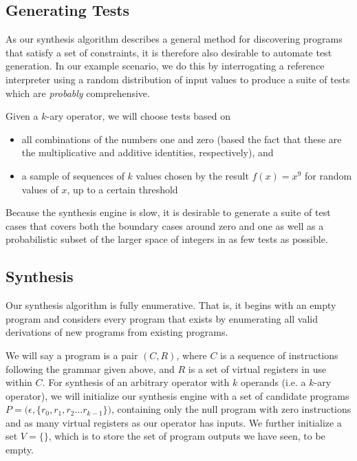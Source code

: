 \documentclass{article}
\begin{document}
\subsection{Generating Tests}

As our synthesis algorithm describes a general method for discovering programs
that satisfy a set of constraints, it is therefore also desirable to automate
test generation.  In our example scenario, we do this by interrogating a
reference interpreter using a random distribution of input values to produce
a suite of tests which are \textit{probably} comprehensive.

Given a $k$-ary operator, we will choose tests based on
\begin{itemize}
    \item all combinations of the numbers one and zero (based the fact that
	these are the multiplicative and additive identities, respectively),
	and
    \item a sample of sequences of $k$ values chosen by the result $f(x)=x^{9}$
	for random values of $x$, up to a certain threshold
\end{itemize}

Because the synthesis engine is slow, it is desirable to generate a suite of
test cases that covers both the boundary cases around zero and one as well as
a probabilistic subset of the larger space of integers in as few tests as
possible.

\subsection{Synthesis}

Our synthesis algorithm is fully enumerative.  That is, it begins with an empty
program and considers every program that exists by enumerating all valid
derivations of new programs from existing programs.

We will say a program is a pair $(C,R)$, where $C$ is a sequence of
instructions following the grammar given above, and $R$ is a set of virtual
registers in use within $C$.  For synthesis of an arbitrary operator with $k$
operands (i.e. a $k$-ary operator), we will initialize our synthesis engine
with a set of candidate programs $P = {(\epsilon, \{r_{0}, r_{1}, r_{2} \ldots
r_{k-1}}\})$, containing only the null program with zero instructions and as
many virtual registers as our operator has inputs. We further initialize a set
$V = \{\}$, which is to store the set of program outputs we have seen, to be
empty.
\end{document}
